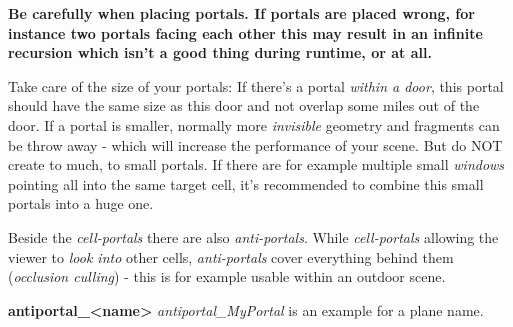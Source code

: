 \textbf{Be carefully when placing portals. If portals are placed wrong, for instance two portals facing each other this may result in an infinite recursion which isn't a good thing during runtime, or at all.}

Take care of the size of your portals: If there's a portal \emph{within a door}, this portal should have the same size as this door and not overlap some miles out of the door. If a portal is smaller, normally more \emph{invisible} geometry and fragments can be throw away - which will increase the performance of your scene.
But do NOT create to much, to small portals. If there are for example multiple small \emph{windows} pointing all into the same target cell, it's recommended to combine this small portals into a huge one.

Beside the \emph{cell-portals} there are also \emph{anti-portals}. While \emph{cell-portals} allowing the viewer to \emph{look into} other cells, \emph{anti-portals} cover everything behind them (\emph{occlusion culling}) - this is for example usable within an outdoor scene.

\textbf{antiportal\_<name>}
\emph{antiportal\_MyPortal} is an example for a plane name.
